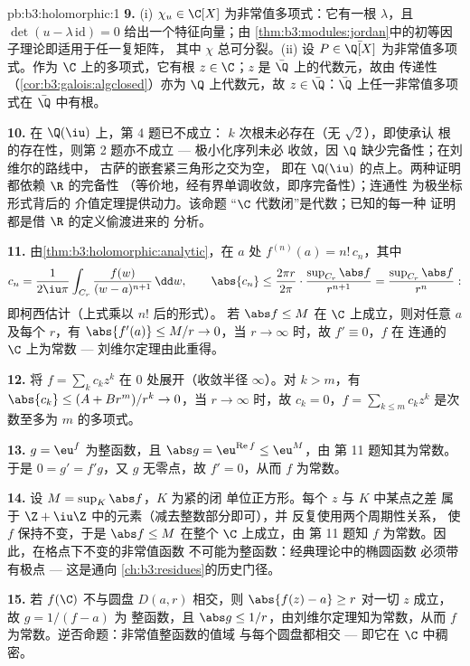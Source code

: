 \begin{solution}{pb:b3:holomorphic:1}
\textbf{9.} (i) $\chi_u \in \C[X]$ 为非常值多项式：它有一根
$\lambda$，且 $\det(u - \lambda\,\mathrm{id}) = 0$
给出一个特征向量；由
\cref{thm:b3:modules:jordan}中的初等因子理论即适用于任一复矩阵，
其中 $\chi$ 总可分裂。(ii) 设 $P \in \bar\Q[X]$
为非常值多项式。作为 $\C$ 上的多项式，它有根 $z
\in \C$；$z$ 是 $\bar\Q$ 上的代数元，故由
传递性（\cref{cor:b3:galois:algclosed}）亦为 $\Q$ 上代数元，故 $z \in
\bar\Q$：$\bar\Q$ 上任一非常值多项式在
$\bar\Q$ 中有根。

\textbf{10.} 在 $\Q(\iu)$ 上，第 4 题已不成立：
$k$ 次根未必存在（无 $\sqrt2$），即使承认
根的存在性，则第 2 题亦不成立 --- 极小化序列未必
收敛，因 $\Q$ 缺少完备性；在刘维尔的路线中，
古萨的嵌套紧三角形之交为空，
即在 $\Q(\iu)$ 的点上。两种证明都依赖 $\R$ 的完备性
（等价地，经有界单调收敛，即序完备性）；连通性
为极坐标形式背后的
介值定理提供动力。该命题
“$\C$ 代数闭”是代数；已知的每一种
证明都是借 $\R$ 的定义偷渡进来的
分析。

\textbf{11.} 由\cref{thm:b3:holomorphic:analytic}，在 $a$ 处
$f^{(n)}(a) = n!\,c_n$，其中
\[
c_n = \frac1{2\iu\pi}\int_{C_r}\frac{f(w)}{(w -
a)^{n+1}}\,\dd w,
\qquad
\abs{c_n} \leq \frac{2\pi r}{2\pi}\cdot
\frac{\sup_{C_r}\abs f}{r^{n+1}}
= \frac{\sup_{C_r}\abs f}{r^{n}} :
\]
即柯西估计（上式乘以 $n!$ 后的形式）。
若 $\abs f \leq M$ 在 $\C$ 上成立，则对任意
$a$ 及每个 $r$，有 $\abs{f'(a)} \leq M/r \to 0$，当 $r \to
\infty$ 时，故 $f' \equiv 0$，$f$ 在
连通的 $\C$ 上为常数 --- 刘维尔定理由此重得。

\textbf{12.} 将 $f = \sum_kc_kz^k$ 在 $0$ 处展开（收敛半径
$\infty$）。对 $k > m$，有 $\abs{c_k} \leq (A + Br^m)/r^k \to
0$，当 $r \to \infty$ 时，故 $c_k = 0$，$f =
\sum_{k\leq m}c_kz^k$ 是次数至多为 $m$ 的多项式。

\textbf{13.} $g = \eu^f$ 为整函数，且 $\abs g =
\eu^{\operatorname{Re}f} \leq \eu^M$，由
第 11 题知其为常数。于是 $0 = g' = f'g$，又 $g$ 无零点，故 $f' = 0$，从而 $f$
为常数。

\textbf{14.} 设 $M = \sup_K\abs f$，$K$ 为紧的闭
单位正方形。每个 $z$ 与 $K$ 中某点之差
属于 $\Z + \iu\Z$ 中的元素（减去整数部分即可），并
反复使用两个周期性关系，
使 $f$ 保持不变，于是 $\abs f \leq M$ 在整个 $\C$ 上成立，由
第 11 题知 $f$ 为常数。因此，在格点下不变的非常值函数
不可能为整函数：经典理论中的椭圆函数
必须带有极点 --- 这是通向
\cref{ch:b3:residues}的历史门径。

\textbf{15.} 若 $f(\C)$ 不与圆盘 $D(a, r)$ 相交，则
$\abs{f(z) - a} \geq r$ 对一切 $z$ 成立，故 $g = 1/(f - a)$ 为
整函数，且 $\abs g \leq 1/r$，由刘维尔定理知为常数，从而
$f$ 为常数。逆否命题：非常值整函数的值域
与每个圆盘都相交 --- 即它在 $\C$ 中稠密。


\end{solution}

